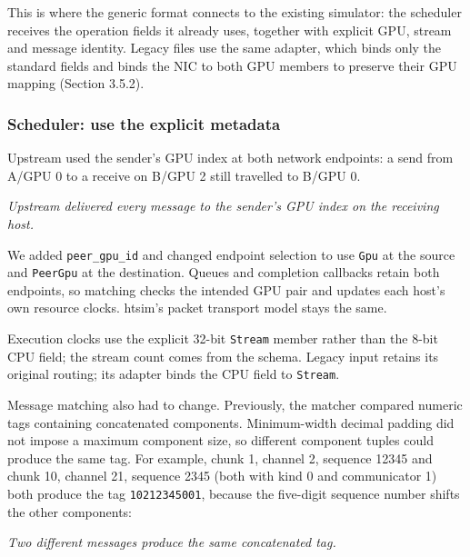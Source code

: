 \documentclass[10pt,a4paper]{article}
\begin{document}
This is where the generic format connects to the existing simulator: the scheduler receives the operation fields it already uses, together with explicit GPU, stream and message identity. Legacy files use the same adapter, which binds only the standard fields and binds the NIC to both GPU members to preserve their GPU mapping (Section 3.5.2).

\hypertarget{scheduler-use-the-explicit-metadata}{}
\subsubsection{Scheduler: use the explicit metadata}

Upstream used the sender's GPU index at both network endpoints: a send from A/GPU 0 to a receive on B/GPU 2 still travelled to B/GPU 0.

\begin{center}
\resizebox{0.44\linewidth}{!}{}
\par\nopagebreak\small\itshape Upstream delivered every message to the sender's GPU index on the receiving host.
\end{center}

 We added \texttt{peer\_\allowbreak{}gpu\_\allowbreak{}id} and changed endpoint selection to use \texttt{Gpu} at the source and \texttt{PeerGpu} at the destination. Queues and completion callbacks retain both endpoints, so matching checks the intended GPU pair and updates each host's own resource clocks. htsim's packet transport model stays the same.

Execution clocks use the explicit 32-bit \texttt{Stream} member rather than the 8-bit CPU field; the stream count comes from the schema. Legacy input retains its original routing; its adapter binds the CPU field to \texttt{Stream}.

Message matching also had to change. Previously, the matcher compared numeric tags containing concatenated components. Minimum-width decimal padding did not impose a maximum component size, so different component tuples could produce the same tag. For example, chunk 1, channel 2, sequence 12345 and chunk 10, channel 21, sequence 2345 (both with kind 0 and communicator 1) both produce the tag \texttt{10212345001}, because the five-digit sequence number shifts the other components:

\begin{center}
\resizebox{0.85\linewidth}{!}{}
\par\nopagebreak\small\itshape Two different messages produce the same concatenated tag.
\end{center}
\end{document}

